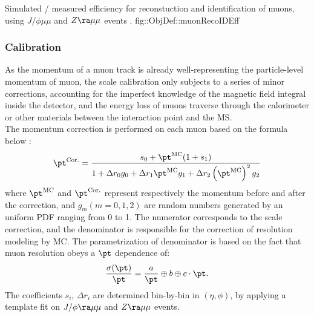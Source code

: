 { Simulated / measured efficiency for reconstuction and identification of muons, using $J/\phi\mu\mu$ and $Z\ra\mu\mu$ events \cite{166_muonPerformance2015data}.}
{fig::ObjDef::muonRecoIDEff}





\subsubsection{Calibration} \label{sec::objDef::muons::calib}
As the momentum of a muon track is already well-representing the particle-level momentum of muon, 
the scale calibration only subjects to a series of minor corrections, accounting for the imperfect knowledge of the magnetic field integral inside the detector, and the energy loss of muons traverse through the calorimeter or other materials between the interaction point and the MS. \\

The momentum correction is performed on each muon based on the formula below \cite{165_muonPerf2011_2012}:
\begin{align}
\pt^{\mathrm{Cor.}} = \frac{ s_0  + \pt^{\mathrm{MC}}  (1+s_1) } {1+ \Delta r_0  g_0  + \Delta r_1 
 \pt^{\mathrm{MC}} g_1  + \Delta r_2 \left( \pt^{\mathrm{MC}} \right)^2  g_2} 
\end{align}
where $\pt^{\mathrm{MC}}$ and $\pt^{\mathrm{Cor.}}$ represent respectively the momentum before and after the correction, and $g_m (m=0,1,2)$ are random numbers generated by an uniform PDF ranging from 0 to 1.
The numerator corresponds to the scale correction, and the denominator is responsible for the correction of resolution modeling by MC. The parametrization of denominator is based on the fact that muon resolution obeys a $\pt$ dependence of:
\begin{align}
\frac{\sigma(\pt)}{\pt} = \frac{a}{\pt} \oplus b \oplus c \cdot \pt.
\end{align}
%
The coefficients $s_i$, $\Delta r_i$ are determined bin-by-bin in $(\eta,\phi)$, 
by applying a template fit on $J/\phi\ra \mu\mu$ and $Z\ra \mu\mu$ events. \\

